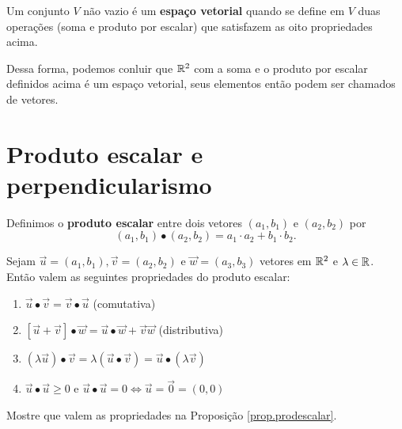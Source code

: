 \begin{remark}
    Um conjunto \(V\) não vazio é um \textbf{espaço vetorial} quando se define em \(V\) duas operações (soma e produto por escalar) que satisfazem as oito propriedades acima.

    Dessa forma, podemos conluir que \(\mathbb{R}^2\) com a soma e o produto por escalar definidos acima é um espaço vetorial, seus elementos então podem ser chamados de vetores.
\end{remark}

\section{Produto escalar e perpendicularismo}

\begin{definition}
    Definimos o \textbf{produto escalar} entre dois vetores \((a_1,b_1)\) e \((a_2,b_2)\) por \[(a_1,b_1) \bullet (a_2,b_2) = a_1\cdot a_2 + b_1\cdot b_2.\]
\end{definition}

\begin{proposition}\label{prop.prodescalar}
    Sejam \(\overrightarrow{u} = (a_1,b_1), \overrightarrow{v} = (a_2,b_2)\) e \(\overrightarrow{w} = (a_3,b_3)\) vetores em \(\mathbb{R}^2\) e \(\lambda\in\mathbb{R}\). Então valem as seguintes propriedades do produto escalar:
        \begin{enumerate}
            \item \(\overrightarrow{u}\bullet\overrightarrow{v} = \overrightarrow{v}\bullet\overrightarrow{u}\) (comutativa)
            \item \([\overrightarrow{u} + \overrightarrow{v}]\bullet\overrightarrow{w} = \overrightarrow{u}\bullet\overrightarrow{w} + \overrightarrow{v}\overrightarrow{w}\) (distributiva)
            \item \((\lambda\overrightarrow{u})\bullet\overrightarrow{v} = \lambda(\overrightarrow{u}\bullet\overrightarrow{v}) = \overrightarrow{u}\bullet(\lambda\overrightarrow{v})\)
            \item \(\overrightarrow{u}\bullet\overrightarrow{u} \geq 0\) e \(\overrightarrow{u}\bullet\overrightarrow{u} = 0 \Leftrightarrow \overrightarrow{u}=\overrightarrow{0} = (0,0)\)
        \end{enumerate}
\end{proposition}

\begin{exercise}
    Mostre que valem as propriedades na Proposição \ref{prop.prodescalar}.
\end{exercise}

